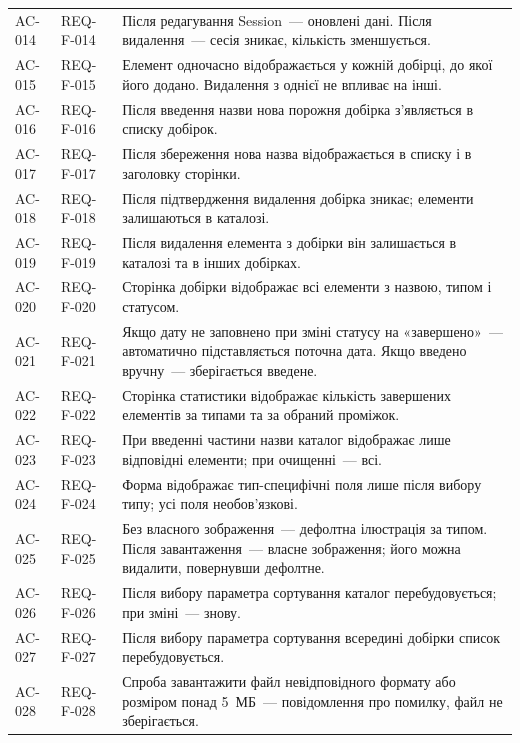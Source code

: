 \begin{longtable}{L{2cm} L{2.5cm} L{9.5cm}}
\addlinespace
AC-014 & REQ-F-014 & Після редагування Session~--- оновлені дані. Після видалення~--- сесія зникає, кількість зменшується.  \\
\addlinespace
AC-015 & REQ-F-015 & Елемент одночасно відображається у кожній добірці, до якої його додано. Видалення з однієї не впливає на інші.  \\
\addlinespace
AC-016 & REQ-F-016 & Після введення назви нова порожня добірка з'являється в списку добірок.  \\
\addlinespace
AC-017 & REQ-F-017 & Після збереження нова назва відображається в списку і в заголовку сторінки.  \\
\addlinespace
AC-018 & REQ-F-018 & Після підтвердження видалення добірка зникає; елементи залишаються в каталозі.  \\
\addlinespace
AC-019 & REQ-F-019 & Після видалення елемента з добірки він залишається в каталозі та в інших добірках.  \\
\addlinespace
AC-020 & REQ-F-020 & Сторінка добірки відображає всі елементи з назвою, типом і статусом.  \\
\addlinespace
AC-021 & REQ-F-021 & Якщо дату не заповнено при зміні статусу на «завершено»~--- автоматично підставляється поточна дата. Якщо введено вручну~--- зберігається введене.  \\
\addlinespace
AC-022 & REQ-F-022 & Сторінка статистики відображає кількість завершених елементів за типами та за обраний проміжок.  \\
\addlinespace
AC-023 & REQ-F-023 & При введенні частини назви каталог відображає лише відповідні елементи; при очищенні~--- всі.  \\
\addlinespace
AC-024 & REQ-F-024 & Форма відображає тип-специфічні поля лише після вибору типу; усі поля необов'язкові.  \\
\addlinespace
AC-025 & REQ-F-025 & Без власного зображення~--- дефолтна ілюстрація за типом. Після завантаження~--- власне зображення; його можна видалити, повернувши дефолтне.  \\
\addlinespace
AC-026 & REQ-F-026 & Після вибору параметра сортування каталог перебудовується; при зміні~--- знову.  \\
\addlinespace
AC-027 & REQ-F-027 & Після вибору параметра сортування всередині добірки список перебудовується.  \\
\addlinespace
AC-028 & REQ-F-028 & Спроба завантажити файл невідповідного формату або розміром понад 5~МБ~--- повідомлення про помилку, файл не зберігається.  \\

\end{longtable}
